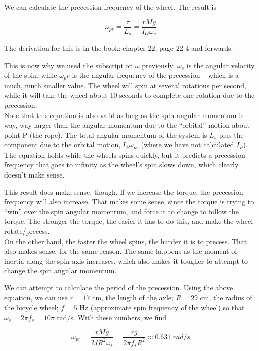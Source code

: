 \documentclass[8.01x]{subfiles}
\begin{document}
We can calculate the precession frequency of the wheel. The result is

\begin{equation}
\omega_{pr} = \frac{\tau}{L_s} = \frac{r M g}{I_Q \omega_s}
\end{equation}

The derivation for this is in the book: chapter 22, page 22-4 and forwards.

This is now why we used the subscript on $\omega$ previously. $\omega_s$ is the angular velocity of the spin, while $\omega_pr$ is the angular frequency of the precession -- which is a much, much smaller value. The wheel will spin at several rotations per second, while it will take the wheel about 10 seconds to complete one rotation due to the precession.\\
Note that this equation is also valid as long as the spin angular momentum is way, way larger than the angular momentum due to the ``orbital'' motion about point P (the rope). The total angular momentum of the system is $L_s$ plus the component due to the orbital motion, $I_P \omega_{pr}$ (where we have not calculated $I_P$).\\
The equation holds while the wheels spins quickly, but it predicts a precession frequency that goes to infinity as the wheel's spin slows down, which clearly doesn't make sense.

This result does make sense, though. If we increase the torque, the precession frequency will also increase. That makes some sense, since the torque is trying to ``win'' over the spin angular momentum, and force it to change to follow the torque. The stronger the torque, the easier it has to do this, and make the wheel rotate/precess.\\
On the other hand, the faster the wheel spins, the harder it is to precess. That also makes sense, for the same reason. The same happens as the moment of inertia along the spin axis increases, which also makes it tougher to attempt to change the spin angular momentum.

We can attempt to calculate the period of the precession. Using the above equation, we can use $r = 17$ cm, the length of the axle; $R = 29$ cm, the radius of the bicycle wheel; $f = 5$ Hz (approximate spin frequency of the wheel) so that $\omega_s = 2 \pi f_s = 10 \pi$ rad/s. With these numbers, we find

\begin{equation}
\omega_{pr} = \frac{r M g}{M R^2 \omega_s} = \frac{r g}{2 \pi f_s R^2} \approx \SI{0.631}{rad/s}
\end{equation}
\end{document}
